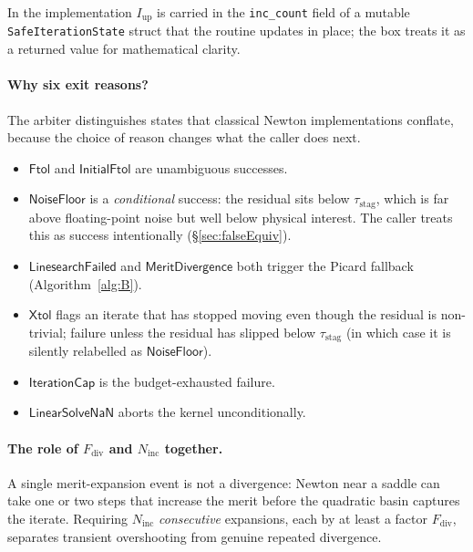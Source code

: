 \documentclass{article}
\newcommand{\code}[1]{\texttt{\small #1}}
\newcommand{\textstag}{\tau_{\mathrm{stag}}}
\begin{document}
\noindent In the implementation $I_{\mathrm{up}}$ is carried in the
\code{inc\_count} field of a mutable \code{SafeIterationState} struct
that the routine updates in place; the box treats it as a returned
value for mathematical clarity.

\paragraph{Why six exit reasons?}  The arbiter distinguishes states
that classical Newton implementations conflate, because the choice of
reason changes what the caller does next.
\begin{itemize}
\item $\mathsf{Ftol}$ and $\mathsf{InitialFtol}$ are unambiguous
successes.
\item $\mathsf{NoiseFloor}$ is a \emph{conditional} success: the
residual sits below $\textstag$, which is far above floating-point
noise but well below physical interest. The caller treats this as
success intentionally (§\ref{sec:falseEquiv}).
\item $\mathsf{LinesearchFailed}$ and $\mathsf{MeritDivergence}$ both
trigger the Picard fallback (Algorithm~\ref{alg:B}).
\item $\mathsf{Xtol}$ flags an iterate that has stopped moving even
though the residual is non-trivial; failure unless the residual has
slipped below $\textstag$ (in which case it is silently relabelled as
$\mathsf{NoiseFloor}$).
\item $\mathsf{IterationCap}$ is the budget-exhausted failure.
\item $\mathsf{LinearSolveNaN}$ aborts the kernel unconditionally.
\end{itemize}

\paragraph{The role of $F_{\mathrm{div}}$ and $N_{\mathrm{inc}}$ together.}
A single merit-expansion event is not a divergence: Newton near a
saddle can take one or two steps that increase the merit before the
quadratic basin captures the iterate. Requiring $N_{\mathrm{inc}}$
\emph{consecutive} expansions, each by at least a factor
$F_{\mathrm{div}}$, separates transient overshooting from genuine
repeated divergence.
\end{document}

